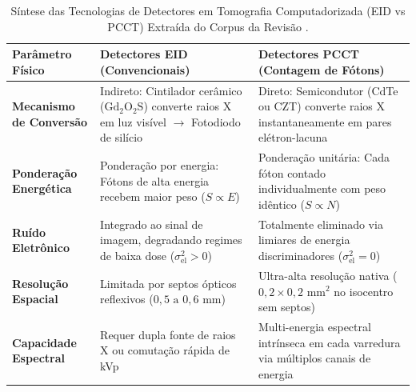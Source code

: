 \documentclass[
  12pt,
  a4paper,
  oneside
]{report}
\begin{document}
\begin{table}[htbp]
  \centering
  \small
  \caption[Comparativo Tecnológico de Detectores em Tomografia]{Síntese das Tecnologias de Detectores em Tomografia Computadorizada (EID vs PCCT) Extraída do Corpus da Revisão \cite{willemink2018, rajendran2021, mccollough2026, pimenta2026, greffier2026}.}
  \label{tab:detectores_comparativo}
  \renewcommand{\arraystretch}{1.25}
  \begin{tabularx}{\textwidth}{>{\RaggedRight\bfseries}p{} >{\RaggedRight}p{} >{\RaggedRight\arraybackslash}X}
    \toprule
    \textbf{Parâmetro Físico} & \textbf{Detectores EID (Convencionais)} & \textbf{Detectores PCCT (Contagem de Fótons)} \\
    \midrule
    Mecanismo de Conversão \cite{bushberg2020, willemink2018} & Indireto: Cintilador cerâmico ($\text{Gd}_2\text{O}_2\text{S}$) converte raios X em luz visível $\to$ Fotodiodo de silício & Direto: Semicondutor (CdTe ou CZT) converte raios X instantaneamente em pares elétron-lacuna \\
    \addlinespace[0.4em]
    Ponderação Energética \cite{rajendran2021} & Ponderação por energia: Fótons de alta energia recebem maior peso ($S \propto E$) & Ponderação unitária: Cada fóton contado individualmente com peso idêntico ($S \propto N$) \\
    \addlinespace[0.4em]
    Ruído Eletrônico \cite{mccollough2026} & Integrado ao sinal de imagem, degradando regimes de baixa dose ($\sigma_{\text{el}}^2 > 0$) & Totalmente eliminado via limiares de energia discriminadores ($\sigma_{\text{el}}^2 = 0$) \\
    \addlinespace[0.4em]
    Resolução Espacial \cite{pimenta2026, greffier2026} & Limitada por septos ópticos reflexivos ($0{,}5 \text{ a } 0{,}6\text{ mm}$) & Ultra-alta resolução nativa ($0{,}2 \times 0{,}2\text{ mm}^2$ no isocentro sem septos) \\
    \addlinespace[0.4em]
    Capacidade Espectral \cite{willemink2018, rajendran2021} & Requer dupla fonte de raios X ou comutação rápida de kVp & Multi-energia espectral intrínseca em cada varredura via múltiplos canais de energia \\
    \bottomrule
  \end{tabularx}
  \vspace{0.3em}\par{}
\end{table}
\end{document}
